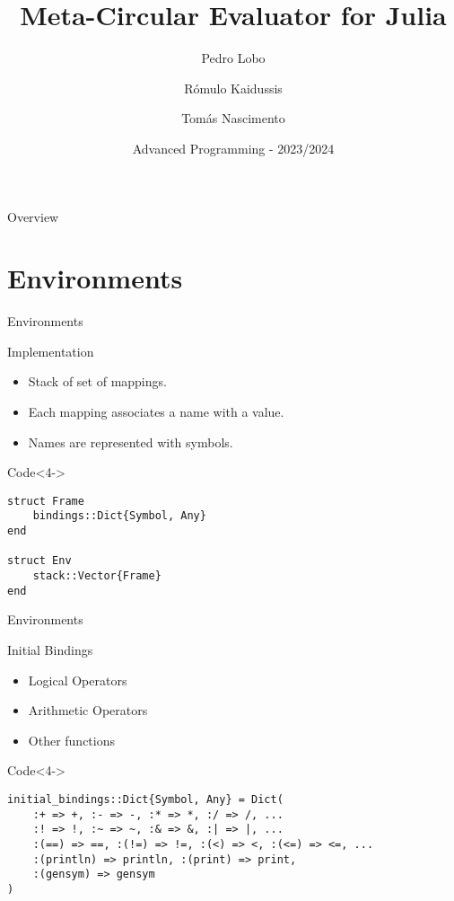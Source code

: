 \documentclass[aspectratio=169]{beamer}
\title{Meta-Circular Evaluator for Julia}
\author{Pedro Lobo \and Rómulo Kaidussis \and Tomás Nascimento}
\date{Advanced Programming - 2023/2024}
\begin{document}
\maketitle

\begin{frame}{Overview}
    \tableofcontents
\end{frame}

\section{Environments}
\begin{frame}[fragile]{Environments}
    \begin{block}{Implementation}
        \begin{itemize}
            \item<1-> Stack of set of mappings.
            \item<2-> Each mapping associates a name with a value.
            \item<3-> Names are represented with symbols.
        \end{itemize}
    \end{block}
    \begin{exampleblock}{Code}<4->
        \footnotesize \begin{verbatim}struct Frame
    bindings::Dict{Symbol, Any}
end

struct Env
    stack::Vector{Frame}
end\end{verbatim}
    \end{exampleblock}
\end{frame}

\begin{frame}[fragile]{Environments}
    \begin{block}{Initial Bindings}
        \begin{itemize}
            \item<1-> Logical Operators
            \item<2-> Arithmetic Operators
            \item<3-> Other functions
        \end{itemize}
    \end{block}

    \begin{exampleblock}{Code}<4->
        \footnotesize \begin{verbatim}initial_bindings::Dict{Symbol, Any} = Dict(
    :+ => +, :- => -, :* => *, :/ => /, ...
    :! => !, :~ => ~, :& => &, :| => |, ...
    :(==) => ==, :(!=) => !=, :(<) => <, :(<=) => <=, ...
    :(println) => println, :(print) => print,
    :(gensym) => gensym
)\end{verbatim}
    \end{exampleblock}
\end{frame}
\end{document}

